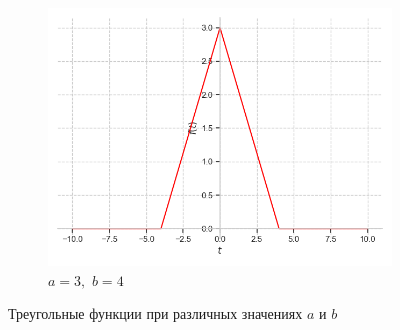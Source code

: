 \documentclass[a4paper, 16pt]{article}
\begin{document}
\begin{figure}[htbp]
\begin{subfigure}{0.3\textwidth}
            \label{fig:triangf_2}
        \end{subfigure}
        \hfill
        \begin{subfigure}{0.3\textwidth}
            \centering
            \includegraphics[width=\linewidth]{trif_a=3_b=4.png}
            \caption{$a=3,\,\,b=4$}
            \label{fig:triangf_3}
        \end{subfigure}
        \caption{Треугольные функции при различных значениях $a$ и $b$}
        \label{fig:triangfs}
    \end{figure}
\end{document}
